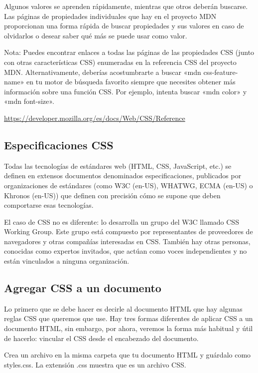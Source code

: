 Algunos valores se aprenden rápidamente, mientras que otros deberán buscarse. Las páginas de propiedades individuales que hay en el proyecto MDN proporcionan una forma rápida de buscar propiedades y sus valores en caso de olvidarlos o desear saber qué más se puede usar como valor.

\begin{remark}
Nota: Puedes encontrar enlaces a todas las páginas de las propiedades CSS (junto con otras características CSS) enumeradas en la referencia CSS del proyecto MDN. Alternativamente, deberías acostumbrarte a buscar «mdn css-feature-name» en tu motor de búsqueda favorito siempre que necesites obtener más información sobre una función CSS. Por ejemplo, intenta buscar «mdn color» y «mdn font-size».
\end{remark}

\url{https://developer.mozilla.org/es/docs/Web/CSS/Reference}

\subsection{Especificaciones CSS}

Todas las tecnologías de estándares web (HTML, CSS, JavaScript, etc.) se definen en extensos documentos denominados especificaciones, publicados por organizaciones de estándares (como W3C (en-US), WHATWG, ECMA (en-US) o Khronos (en-US)) que definen con precisión cómo se supone que deben comportarse esas tecnologías.

El caso de CSS no es diferente: lo desarrolla un grupo del W3C llamado CSS Working Group. Este grupo está compuesto por representantes de proveedores de navegadores y otras compañías interesadas en CSS. También hay otras personas, conocidas como expertos invitados, que actúan como voces independientes y no están vinculados a ninguna organización.

\subsection{Agregar CSS a un documento}

Lo primero que se debe hacer es decirle al documento HTML que hay algunas reglas CSS que queremos que use. Hay tres formas diferentes de aplicar CSS a un documento HTML, sin embargo, por ahora, veremos la forma más habitual y útil de hacerlo: vincular el CSS desde el encabezado del documento.

Crea un archivo en la misma carpeta que tu documento HTML y guárdalo como styles.css. La extensión .css muestra que es un archivo CSS.

